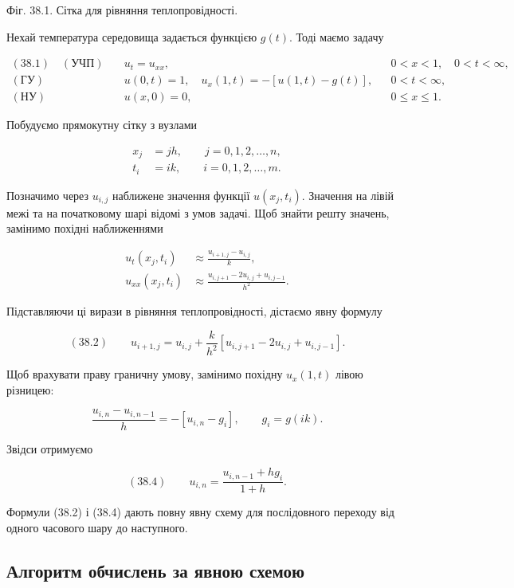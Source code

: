 \documentclass[
  ukrainian,
]{article}
\begin{document}
Фіг. 38.1. Сітка для рівняння теплопровідності.

Нехай температура середовища задається функцією \(g(t)\). Тоді маємо
задачу

\[\begin{aligned}(38.1)\quad (\text{УЧП})\quad & u_t=u_{xx}, && 0<x<1,\quad 0<t<\infty,\\(\text{ГУ})\quad & u(0,t)=1,\quad u_x(1,t)=-\left[u(1,t)-g(t)\right], && 0<t<\infty,\\(\text{НУ})\quad & u(x,0)=0, && 0\le x\le 1.\end{aligned}\]

Побудуємо прямокутну сітку з вузлами

\[\begin{aligned}x_j&=jh,\qquad j=0,1,2,\dots,n,\\t_i&=ik,\qquad i=0,1,2,\dots,m.\end{aligned}\]

Позначимо через \(u_{i,j}\) наближене значення функції \(u(x_j,t_i)\).
Значення на лівій межі та на початковому шарі відомі з умов задачі. Щоб
знайти решту значень, замінимо похідні наближеннями

\[\begin{aligned}u_t(x_j,t_i)&\approx \frac{u_{i+1,j}-u_{i,j}}{k},\\u_{xx}(x_j,t_i)&\approx \frac{u_{i,j+1}-2u_{i,j}+u_{i,j-1}}{h^2}.\end{aligned}\]

Підставляючи ці вирази в рівняння теплопровідності, дістаємо явну
формулу

\[(38.2)\qquad u_{i+1,j}=u_{i,j}+\frac{k}{h^2}\left[u_{i,j+1}-2u_{i,j}+u_{i,j-1}\right].\]

Щоб врахувати праву граничну умову, замінимо похідну \(u_x(1,t)\) лівою
різницею:

\[\frac{u_{i,n}-u_{i,n-1}}{h}=-\left[u_{i,n}-g_i\right],\qquad g_i=g(ik).\]

Звідси отримуємо

\[(38.4)\qquad u_{i,n}=\frac{u_{i,n-1}+h g_i}{1+h}.\]

Формули (38.2) і (38.4) дають повну явну схему для послідовного переходу
від одного часового шару до наступного.

\subsection{Алгоритм обчислень за явною
схемою}\label{ux430ux43bux433ux43eux440ux438ux442ux43c-ux43eux431ux447ux438ux441ux43bux435ux43dux44c-ux437ux430-ux44fux432ux43dux43eux44e-ux441ux445ux435ux43cux43eux44e}
\end{document}
